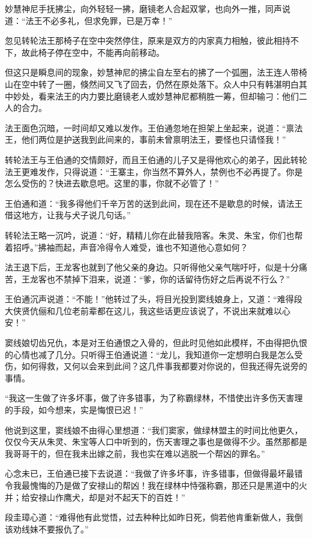 \documentclass[12pt,oneside]{book}
\begin{document}
妙慧神尼手抚拂尘，向外轻轻一拂，磨镜老人合起双掌，也向外一推，同声说道：``法王不必多礼，但求免罪，已是万幸！''

忽见转轮法王那椅子在空中突然停住，原来是双方的内家真力相触，彼此相持不下，故此椅子停在空中，不能再向前移动。

但这只是瞬息间的现象，妙慧神尼的拂尘自左至右的拂了一个弧圈，法王连人带椅山在空中转了一圈，倏然间又飞了回去，仍然在原处落下。众人中只有韩湛明白其中妙处，看来法王的内力要比磨镜老人或妙慧神尼都稍胜一筹，但却输刁：他们二人的合力。

法王面色沉暗，一时间却又难以发作。王伯通忽地在担架上坐起来，说道：``禀法王，他们两位是护送我到此间来的，事前未曾禀明法王，要怪也只请怪我！''

转轮法王与王伯通的交情颇好，而且王伯通的儿子又是得他欢心的弟子，因此转轮法王更难发作，只得说道：``王寨主，你当然不算外人，禁例也不必再提了。你是怎么受伤的？快进去歇息吧。这里的事，你就不必管了！''

王伯通和道：``我多得他们千辛万苦的送到此间，现在还不是歇息的时候，请法王借这地方，让我与犬子说几句话。''

转轮法王略一沉吟，说道：``好，精精儿你在此替我陪客。朱灵、朱宝，你们也帮着招呼。''拂袖而起，声音冷得令人难受，谁也不知道他心意如何？

法王退下后，王龙客也就到了他父亲的身边。只听得他父亲气喘吁吁，似是十分痛苦，王龙客也不禁掉下泪来，说道：``爹，你的话留待伤好之后再说不行么？''

王伯通沉声说道：``不能！''他转过了头，将目光投到窦线娘身上，又道：``难得段大侠贤伉俪和几位老前辈都在这儿，我这些话更应该说了，不说出来就难以心安！''

窦线娘切齿兄仇，本是对王伯通恨之入骨的，但此时见他如此模样，不由得把仇恨的心情也减了几分。只听得王伯通说道：``龙儿，我知道你一定想明白我是怎么受伤，如何得救，又何以会来到此间？这几件事我都要对你说的，但我还得先说旁的事情。

``我这一生做了许多坏事，做了许多错事，为了称霸绿林，不惜使出许多伤天害理的手段，如今想来，实是悔恨已迟！''

他说到这里，窦线娘不由得心里想道：``我们窦家，做绿林盟主的时间比他更久，仅仅今天从朱灵、朱宝等人口中听到的，伤天害理之事也是做得不少。虽然那都是我哥哥干的，但在我未出嫁之前，我也实在难以逃脱一个帮凶的罪名。''

心念未已，王伯通已接下去说道：``我做了许多坏事，许多错事，但做得最坏最错令我最愧悔的乃是做了安禄山的帮凶！我在绿林中恃强称霸，那还只是黑道中的火并；给安禄山作鹰犬，却是对不起天下的百姓！''

段圭璋心道：``难得他有此觉悟，过去种种比如昨日死，倘若他肯重新做人，我倒该劝线妹不要报仇了。''
\end{document}
